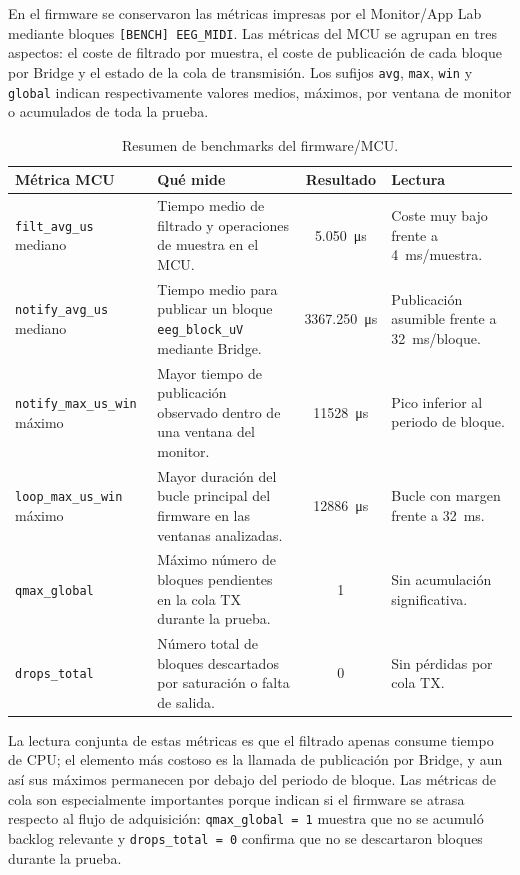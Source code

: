 \documentclass[../main.tex]{subfiles}
\begin{document}
En el firmware se conservaron las métricas impresas por el Monitor/App Lab mediante bloques \texttt{[BENCH] EEG\_MIDI}. Las métricas del MCU se agrupan en tres aspectos: el coste de filtrado por muestra, el coste de publicación de cada bloque por Bridge y el estado de la cola de transmisión. Los sufijos \texttt{avg}, \texttt{max}, \texttt{win} y \texttt{global} indican respectivamente valores medios, máximos, por ventana de monitor o acumulados de toda la prueba.

\begin{table}[htbp]
\centering
\caption{Resumen de benchmarks del firmware/MCU.}
\label{tab:validacion_bench_mcu}
\begin{tabular}{p{} p{} c p{}}
\hline
\textbf{Métrica MCU} & \textbf{Qué mide} & \textbf{Resultado} & \textbf{Lectura} \\
\hline
\texttt{filt\_avg\_us} mediano & Tiempo medio de filtrado y operaciones de muestra en el MCU. & \SI{5.050}{\micro\second} & Coste muy bajo frente a \SI{4}{\milli\second}/muestra. \\
\texttt{notify\_avg\_us} mediano & Tiempo medio para publicar un bloque \texttt{eeg\_block\_uV} mediante Bridge. & \SI{3367.250}{\micro\second} & Publicación asumible frente a \SI{32}{\milli\second}/bloque. \\
\texttt{notify\_max\_us\_win} máximo & Mayor tiempo de publicación observado dentro de una ventana del monitor. & \SI{11528}{\micro\second} & Pico inferior al periodo de bloque. \\
\texttt{loop\_max\_us\_win} máximo & Mayor duración del bucle principal del firmware en las ventanas analizadas. & \SI{12886}{\micro\second} & Bucle con margen frente a \SI{32}{\milli\second}. \\
\texttt{qmax\_global} & Máximo número de bloques pendientes en la cola TX durante la prueba. & 1 & Sin acumulación significativa. \\
\texttt{drops\_total} & Número total de bloques descartados por saturación o falta de salida. & 0 & Sin pérdidas por cola TX. \\
\hline
\end{tabular}
\end{table}

La lectura conjunta de estas métricas es que el filtrado apenas consume tiempo de CPU; el elemento más costoso es la llamada de publicación por Bridge, y aun así sus máximos permanecen por debajo del periodo de bloque. Las métricas de cola son especialmente importantes porque indican si el firmware se atrasa respecto al flujo de adquisición: \texttt{qmax\_global = 1} muestra que no se acumuló backlog relevante y \texttt{drops\_total = 0} confirma que no se descartaron bloques durante la prueba.
\end{document}
